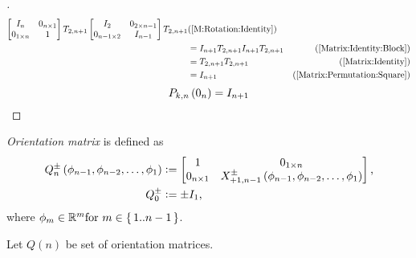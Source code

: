 \documentclass[stu, babel, american, biblatex, a4paper, leqno, draftall]{apa7}
\begin{document}
\begin{proof}[]
\begin{align*}
        \begin{bmatrix}
            I_{n}         & 0_{n\times 1} \\
            0_{1\times n} & 1             \\
        \end{bmatrix}
        T_{2, n+1}
        \begin{bmatrix}
            I_{2}              & 0_{{2}\times{n-1}} \\
            0_{{n-1}\times{2}} & {I}_{n-1}          \\
        \end{bmatrix}
        T_{2, n+1} & \text{(\cref{M:Rotation:Identity})}                     \\
                   & =
        I_{n+1}
        T_{2, n+1}
        I_{n+1}
        T_{2, n+1} & \text{(\cref{Matrix:Identity:Block})}                   \\
                   & =
        T_{2, n+1}
        T_{2, n+1} & \text{(\cref{Matrix:Identity})}                         \\
                   & =
        I_{n+1}    & \text{(\cref{Matrix:Permutation:Square})}
    \end{align*}
    \begin{equation*}
        P_{k,n}
        \left(0_{n}\right)
        =
        I_{n+1}
        \qedhere
    \end{equation*}
\end{proof}
\begin{definition}\label{M:Orientation}
    \textit{Orientation matrix} is defined as
    \begin{align*}
        Q^\pm_n\left(\phi_{n-1},\phi_{n-2},\dots,\phi_1\right) & \vcentcolon=
        \begin{bmatrix}
            1             & 0_{1\times n}                                                 \\
            0_{n\times 1} & X^\pm_{+1,n-1}\left(\phi_{n-1},\phi_{n-2},\dots,\phi_1\right) \\
        \end{bmatrix}\text{,}   \\
        Q^\pm_0                                                & \vcentcolon= \pm I_1\text{,}
    \end{align*}
    where $\phi_m\in\mathbb{R}^m \text{for } m\in\set{1..n-1}$.
\end{definition}
\begin{definition}\label{M:Orientation:Set}
    Let $Q\left(n\right)$ be set of orientation matrices.
\end{definition}
\end{document}
